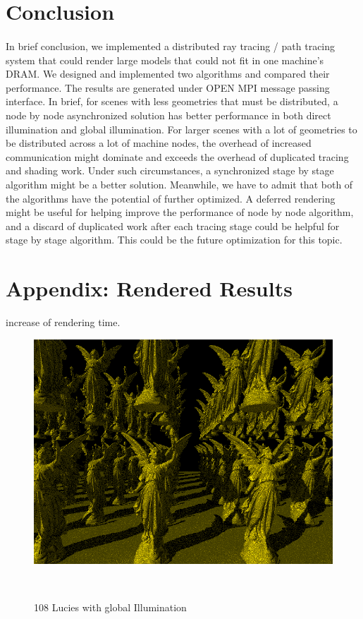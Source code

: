\documentclass[a4paper, oneside, 10pt]{article}
\begin{document}
\section{Conclusion}
\paragraph{} In brief conclusion, we implemented a distributed ray tracing / path tracing system that could render large models that could not fit in one machine's DRAM. We designed and implemented two algorithms and compared their performance. The results are generated under OPEN MPI message passing interface. In brief, for scenes with less geometries that must be distributed, a node by node asynchronized solution has better performance in both direct illumination and global illumination. For larger scenes with a lot of geometries to be distributed across a lot of machine nodes, the overhead of increased communication might dominate and exceeds the overhead of duplicated tracing and shading work.  Under such circumstances, a synchronized stage by stage algorithm might be a better solution. Meanwhile, we have to admit that both of the algorithms have the potential of further optimized. A deferred rendering might be useful for helping improve the performance of node by node algorithm, and a discard of duplicated work after each tracing stage could be helpful for stage by stage algorithm. This could be the future optimization for this topic.
\newpage
\section{Appendix: Rendered Results}
increase of rendering time.
\begin{figure}[h]
\centering
\includegraphics[width=\textwidth]{glucy108}
\caption{108 Lucies with global Illumination}\
\end{figure}
\end{document}
